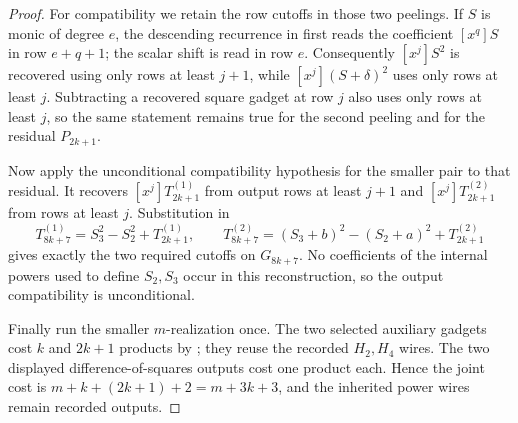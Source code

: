 \begin{proof}
    For compatibility we retain the row cutoffs in those two peelings.  If
    $S$ is monic of degree $e$, the descending recurrence in
     first reads the coefficient
    $[x^q]S$ in row $e+q+1$; the scalar shift is read in row $e$.
    Consequently $[x^j]S^2$ is recovered using only rows at least $j+1$,
    while $[x^j](S+\delta)^2$ uses only rows at least $j$.  Subtracting a
    recovered square gadget at row $j$ also uses only rows at least $j$, so
    the same statement remains true for the second peeling and for the
    residual $P_{2k+1}$.

    Now apply the unconditional compatibility hypothesis for the smaller
    pair to that residual.  It recovers
    $[x^j]T^{(1)}_{2k+1}$ from output rows at least $j+1$ and
    $[x^j]T^{(2)}_{2k+1}$ from rows at least $j$.  Substitution in
    \[
      T^{(1)}_{8k+7}=S_3^2-S_2^2+T^{(1)}_{2k+1},\qquad
      T^{(2)}_{8k+7}=(S_3+b)^2-(S_2+a)^2+T^{(2)}_{2k+1}
    \]
    gives exactly the two required cutoffs on $G_{8k+7}$.  No coefficients
    of the internal powers used to define $S_2,S_3$ occur in this
    reconstruction, so the output compatibility is unconditional.

    Finally run the smaller $m$-realization once.  The two selected auxiliary
    gadgets cost $k$ and $2k+1$ products by
    ; they reuse the recorded $H_2,H_4$ wires.
    The two displayed difference-of-squares outputs cost one product each.
    Hence the joint cost is $m+k+(2k+1)+2=m+3k+3$, and the inherited power
    wires remain recorded outputs.
\end{proof}

